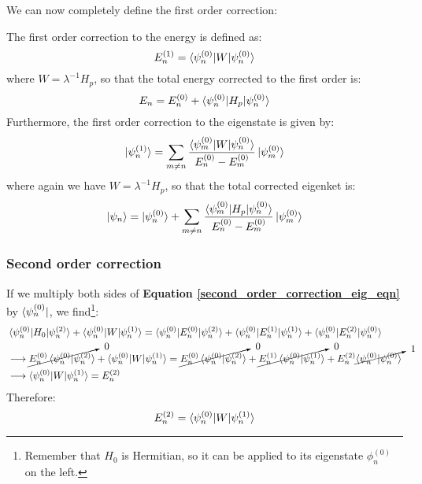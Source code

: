 We can now completely define the first order correction:
\begin{definition}
    The first order correction to the energy is defined as:
    \begin{equation}
        E_n^{(1)} = \braket{\psi_n^{(0)}|W|\psi_n^{(0)}}
    \end{equation}
    where $W = \lambda^{-1}H_p$, so that the total energy corrected to the first order is:
    \begin{equation}
        E_n = E_n^{(0)} + \braket{\psi_n^{(0)}|H_p|\psi_n^{(0)}}
    \end{equation}
    Furthermore, the first order correction to the eigenstate is given by:
    \begin{equation} \label{first_order_correction_ket}
        \ket{\psi_n^{(1)}} = \sum_{m\neq n} \frac{\braket{\psi_m^{(0)}|W|\psi_n^{(0)}}}{E_n^{(0)} - E_m^{(0)}}\ket{\psi_m^{(0)}}
    \end{equation}
    where again we have $W = \lambda^{-1}H_p$, so that the total corrected eigenket is:
    \begin{equation}
        \ket{\psi_n} = \ket{\psi_n^{(0)}} + \sum_{m\neq n} \frac{\braket{\psi_m^{(0)}|H_p|\psi_n^{(0)}}}{E_n^{(0)} - E_m^{(0)}}\ket{\psi_m^{(0)}}
    \end{equation}
\end{definition}

\subsubsection{Second order correction}

If we multiply both sides of \textbf{Equation \ref{second_order_correction_eig_eqn}} by $\bra{\psi_n^{(0)}}$, we find\footnote{Remember that $H_0$ is Hermitian, so it can be applied to its eigenstate $\phi_n^{(0)}$ on the left.}:
\begin{equation}
    \begin{split}
        &\braket{\psi_n^{(0)}|H_0|\psi_n^{(2)}} + \braket{\psi_n^{(0)}|W|\psi_n^{(1)}} = \braket{\psi_n^{(0)}|E_n^{(0)}|\psi_n^{(2)}} + \braket{\psi_n^{(0)}|E_n^{(1)}|\psi_n^{(1)}} + \braket{\psi_n^{(0)}|E_n^{(2)}|\psi_n^{(0)}}\\
        &\longrightarrow \cancelto{\ 0}{E_n^{(0)}\braket{\psi_n^{(0)}|\psi_n^{(2)}}} + \braket{\psi_n^{(0)}|W|\psi_n^{(1)}} = \cancelto{\ 0}{E_n^{(0)}\braket{\psi_n^{(0)}|\psi_n^{(2)}}} + \cancelto{\ 0}{E_n^{(1)}\braket{\psi_n^{(0)}|\psi_n^{(1)}}} + E_n^{(2)}\cancelto{\ 1}{\braket{\psi_n^{(0)}|\psi_n^{(0)}}}\\
        &\longrightarrow \braket{\psi_n^{(0)}|W|\psi_n^{(1)}} = E_n^{(2)}
    \end{split}
\end{equation}
Therefore:
\begin{equation}
    E_n^{(2)} = \braket{\psi_n^{(0)}|W|\psi_n^{(1)}} 
\end{equation}

